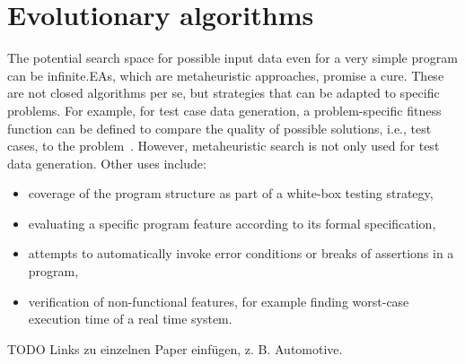 \documentclass[paper=a4,%
  twoside,%
  BCOR4mm,%
  abstract=true,%
  toc=bibliography,%
  chapterprefix=true,%
  toc=bibliographynumbered,%
  open=right,%
  english,%
  pagesize=pdftex]{scrreprt}
\begin{document}
\section{Evolutionary algorithms}
The potential search space for possible input data even for a very simple program can be infinite.\acp{EA}, which are metaheuristic approaches, promise a cure. These are not closed algorithms per se, but strategies that can be adapted to specific problems. For example, for test case data generation, a problem-specific fitness function can be defined to compare the quality of possible solutions, i.e., test cases, to the problem~\cite{McMinn_2004}. However, metaheuristic search is not only used for test data generation. Other uses include:
\begin{itemize}
	\item coverage of the program structure as part of a white-box testing strategy,
	\item evaluating a specific program feature according to its formal specification,
	\item attempts to automatically invoke error conditions or breaks of assertions in a program,
	\item verification of non-functional features, for example finding worst-case execution time of a real time system.
\end{itemize}
TODO Links zu einzelnen Paper einfügen, z. B. Automotive.

\end{document}
